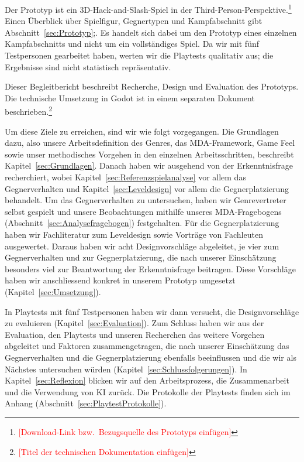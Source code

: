 \documentclass[../Main.tex]{subfiles}
\begin{document}
Der Prototyp ist ein 3D-Hack-and-Slash-Spiel in der Third-Person-Perspektive.\footnote{\textcolor{red}{[Download-Link bzw.\ Bezugsquelle des Prototyps einfügen]}} Einen Überblick über Spielfigur, Gegnertypen und Kampfabschnitt gibt Abschnitt~\ref{sec:Prototyp};. Es handelt sich dabei um den Prototyp eines einzelnen Kampfabschnitts und nicht um ein vollständiges Spiel. Da wir mit fünf Testpersonen gearbeitet haben, werten wir die Playtests qualitativ aus; die Ergebnisse sind nicht statistisch repräsentativ.

Dieser Begleitbericht beschreibt Recherche, Design und Evaluation des Prototyps. Die technische Umsetzung in Godot ist in einem separaten Dokument beschrieben.\footnote{\textcolor{red}{[Titel der technischen Dokumentation einfügen]}}

Um diese Ziele zu erreichen, sind wir wie folgt vorgegangen. Die Grundlagen dazu, also unsere Arbeitsdefinition des Genres, das MDA-Framework, Game Feel sowie unser methodisches Vorgehen in den einzelnen Arbeitsschritten, beschreibt Kapitel~\ref{sec:Grundlagen}. Danach haben wir ausgehend von der Erkenntnisfrage recherchiert, wobei Kapitel~\ref{sec:Referenzspielanalyse} vor allem das Gegnerverhalten und Kapitel~\ref{sec:Leveldesign} vor allem die Gegnerplatzierung behandelt. Um das Gegnerverhalten zu untersuchen, haben wir Genrevertreter selbst gespielt und unsere Beobachtungen mithilfe unseres MDA-Fragebogens (Abschnitt~\ref{sec:Analysefragebogen}) festgehalten. Für die Gegnerplatzierung haben wir Fachliteratur zum Leveldesign\autocite{totten2014architectural,rogers2014levelup} sowie Vorträge von Fachleuten ausgewertet. Daraus haben wir acht Designvorschläge abgeleitet, je vier zum Gegnerverhalten und zur Gegnerplatzierung, die nach unserer Einschätzung besonders viel zur Beantwortung der Erkenntnisfrage beitragen. Diese Vorschläge haben wir anschliessend konkret in unserem Prototyp umgesetzt (Kapitel~\ref{sec:Umsetzung}).

In Playtests mit fünf Testpersonen haben wir dann versucht, die Designvorschläge zu evaluieren (Kapitel~\ref{sec:Evaluation}). Zum Schluss haben wir aus der Evaluation, den Playtests und unseren Recherchen das weitere Vorgehen abgeleitet und Faktoren zusammengetragen, die nach unserer Einschätzung das Gegnerverhalten und die Gegnerplatzierung ebenfalls beeinflussen und die wir als Nächstes untersuchen würden (Kapitel~\ref{sec:Schlussfolgerungen}). In Kapitel~\ref{sec:Reflexion} blicken wir auf den Arbeitsprozess, die Zusammenarbeit und die Verwendung von KI zurück. Die Protokolle der Playtests finden sich im Anhang (Abschnitt~\ref{sec:PlaytestProtokolle}).

\newpage
\end{document}
